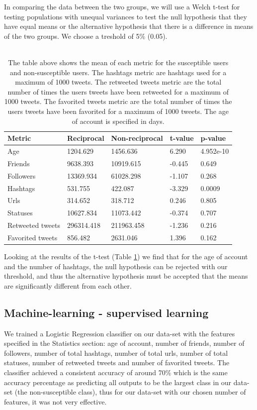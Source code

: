 \documentclass[10pt]{IEEEtran}
\begin{document}
In comparing the data between the two groups, we will use a Welch t-test for testing populations with unequal variances to test the null hypothesis that they have equal means or the alternative hypothesis that there is a difference in means of the two groups.
We choose a treshold of 5\% (0.05).
\\\\
\begin{table}[H]
\centering
\begin{tabular}{lllll}
\hline
Metric & Reciprocal & Non-reciprocal & t-value & p-value \\ \hline
Age & 1204.629 & 1456.636 & 6.290 & 4.952e-10\\
Friends & 9638.393 & 10919.615 & -0.445 & 0.649 \\
Followers & 13369.934 & 61028.298 & -1.107 & 0.268 \\
Hashtags & 531.755 & 422.087 & -3.329 & 0.0009 \\
Urls & 314.652 & 318.712 & 0.246 & 0.805 \\
Statuses & 10627.834 & 11073.442 & -0.374 & 0.707 \\
Retweeted tweets & 296314.418 & 211963.458 & -1.236 & 0.216 \\
Favorited tweets & 856.482 & 2631.046 & 1.396 & 0.162 \\ \hline
\end{tabular}
\caption{The table above shows the mean of each metric for the susceptible users and non-susceptible users. The hashtags metric are hashtags used for a maximum of 1000 tweets. The retweeted tweets metric are the total number of times the users tweets have been retweeted for a maximum of 1000 tweets. The favorited tweets metric are the total number of times the users tweets have been favorited for a maximum of 1000 tweets. The age of account is specified in days.}
\label{tab:t_test}
\end{table}
Looking at the results of the t-test (Table \ref{tab:t_test}) we find that for the age of account and the number of hashtags, the null hypothesis can be rejected with our threshold, and thus the alternative hypothesis must be accepted that the means are significantly different from each other.\\

\subsection{Machine-learning - supervised learning}
We trained a Logistic Regression classifier on our data-set with the features specified in the Statistics section: age of account, number of friends, number of followers, number of total hashtags, number of total urls, number of total statuses, number of retweeted tweets and number of favorited tweets. The classifier achieved a consistent accuracy of around 70\% which is the same accuracy percentage as predicting all outputs to be the largest class in our data-set (the non-susceptible class), thus for our data-set with our chosen number of features, it was not very effective.  
\end{document}
